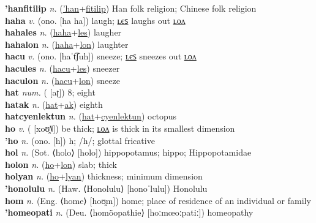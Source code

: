 \textbf{'hanfitilip} \textit{n.} (\hyperref['han]{'han}+\hyperref[fitilip]{fitilip})
Han folk religion; Chinese folk religion \label{'hanfitilip} \\
\textbf{haha} \textit{v.} (ono. [ha ha])
laugh; \hyperref[hahales]{ʟєꜱ} laughs out \hyperref[hahalon]{ʟᴏᴧ} \label{haha} \\
\textbf{hahales} \textit{n.} (\hyperref[haha]{haha}+\hyperref[les]{les})
laugher \label{hahales} \\
\textbf{hahalon} \textit{n.} (\hyperref[haha]{haha}+\hyperref[lon]{lon})
laughter \label{hahalon} \\
\textbf{hacu} \textit{v.} (ono. [haˈt͡ʃuh])
sneeze; \hyperref[hacules]{ʟєꜱ} sneezes out \hyperref[haculon]{ʟᴏᴧ} \label{hacu} \\
\textbf{hacules} \textit{n.} (\hyperref[hacu]{hacu}+\hyperref[les]{les})
sneezer \label{hacules} \\
\textbf{haculon} \textit{n.} (\hyperref[hacu]{hacu}+\hyperref[lon]{lon})
sneeze \label{haculon} \\
\textbf{hat} \textit{num.} ( [aʈ])
8; eight \label{hat} \\
\textbf{hatak} \textit{n.} (\hyperref[hat]{hat}+\hyperref[ak]{ak})
eighth \label{hatak} \\
\textbf{hatcyenlektun} \textit{n.} (\hyperref[hat]{hat}+\hyperref[cyenlektun]{cyenlektun})
octopus \label{hatcyenlektun} \\
\textbf{ho} \textit{v.} ( [xoʊ̯˥˩])
be thick; \hyperref[holon]{ʟᴏᴧ} is thick in its smallest dimension \label{ho} \\
\textbf{'ho} \textit{n.} (ono. [h])
h; /h/; glottal fricative \label{'ho} \\
\textbf{hol} \textit{n.} (Sot. ⟨holo⟩ [holo])
hippopotamus; hippo; Hippopotamidae \label{hol} \\
\textbf{holon} \textit{n.} (\hyperref[ho]{ho}+\hyperref[lon]{lon})
slab; thick \label{holon} \\
\textbf{holyan} \textit{n.} (\hyperref[ho]{ho}+\hyperref[lyan]{lyan})
thickness; minimum dimension \label{holyan} \\
\textbf{'honolulu} \textit{n.} (Haw. ⟨Honolulu⟩ [honoˈlulu])
Honolulu \label{'honolulu} \\
\textbf{hom} \textit{n.} (Eng. ⟨home⟩ [hoʊ̯m])
home; place of residence of an individual or family \label{hom} \\
\textbf{'homeopati} \textit{n.} (Deu. ⟨homöopathie⟩ [hoːmœoːpatiː])
homeopathy \label{'homeopati} \\
